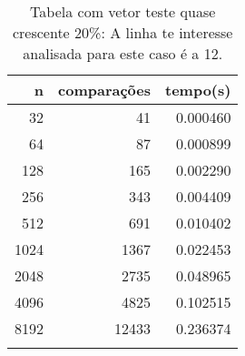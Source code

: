 \begin{table}[ht]
\centering
\begin{tabular}{rrr} \toprule
        n &    comparações &       tempo(s) \\ \midrule
      32  &             41 &      0.000460 \\
      64  &             87 &      0.000899 \\
     128  &            165 &      0.002290 \\
     256  &            343 &      0.004409 \\
     512  &            691 &      0.010402 \\
    1024  &           1367 &      0.022453 \\
    2048  &           2735 &      0.048965 \\
    4096  &           4825 &      0.102515 \\
    8192  &          12433 &      0.236374 \\
\bottomrule\addlinespace
\end{tabular}
\caption{Tabela com vetor teste quase crescente 20\%: A linha te interesse analisada para este caso é a 12.}
\label{tab:quicksortQuaseCresc20}
\end{table}
